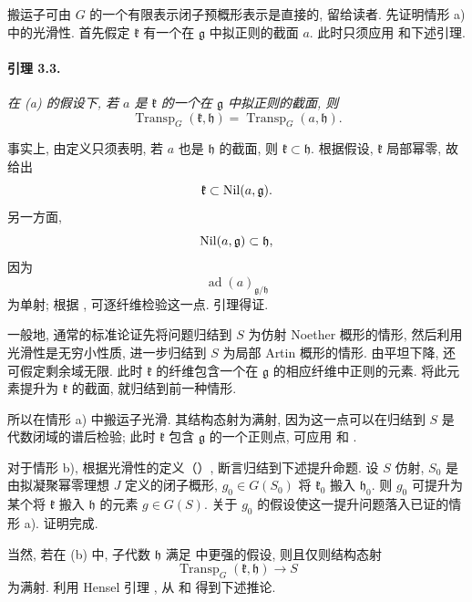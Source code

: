 搬运子可由 \(G\) 的一个有限表示闭子预概形表示是直接的, 留给读者. 先证明情形 a) 中的光滑性. 首先假定 \(\mathfrak k\) 有一个在 \(\mathfrak g\) 中拟正则的截面 \(a\). 此时只须应用  和下述引理.

\paragraph{\textbf{引理 3.3.}}
{\itshape 在 \textup{(a)} 的假设下, 若 \(a\) 是 \(\mathfrak k\) 的一个在 \(\mathfrak g\) 中拟正则的截面, 则
\[
  \operatorname{Transp}_G(\mathfrak k,\mathfrak h)
  =
  \operatorname{Transp}_G(a,\mathfrak h).
\]}

事实上, 由定义只须表明, 若 \(a\) 也是 \(\mathfrak h\) 的截面, 则 \(\mathfrak k\subset\mathfrak h\). 根据假设, \(\mathfrak k\) 局部幂零, 故  给出
\[
  \mathfrak k\subset\operatorname{Nil}(a,\mathfrak g).
\]
另一方面,
\[
  \operatorname{Nil}(a,\mathfrak g)\subset\mathfrak h,
\]
因为
\[
  \operatorname{ad}(a)_{\mathfrak g/\mathfrak h}
\]
为单射; 根据 , 可逐纤维检验这一点. 引理得证.

一般地, 通常的标准论证先将问题归结到 \(S\) 为仿射 Noether 概形的情形, 然后利用光滑性是无穷小性质, 进一步归结到 \(S\) 为局部 Artin 概形的情形. 由平坦下降, 还可假定剩余域无限. 此时 \(\mathfrak k\) 的纤维包含一个在 \(\mathfrak g\) 的相应纤维中正则的元素. 将此元素提升为 \(\mathfrak k\) 的截面, 就归结到前一种情形.

所以在情形 a) 中搬运子光滑. 其结构态射为满射, 因为这一点可以在归结到 \(S\) 是代数闭域的谱后检验; 此时 \(\mathfrak k\) 包含 \(\mathfrak g\) 的一个正则点, 可应用  和 .

对于情形 b), 根据光滑性的定义\textup{（）}, 断言归结到下述提升命题. 设 \(S\) 仿射, \(S_0\) 是由拟凝聚幂零理想 \(J\) 定义的闭子概形, \(g_0\in G(S_0)\) 将 \(\mathfrak k_0\) 搬入 \(\mathfrak h_0\). 则 \(g_0\) 可提升为某个将 \(\mathfrak k\) 搬入 \(\mathfrak h\) 的元素 \(g\in G(S)\). 关于 \(g_0\) 的假设使这一提升问题落入已证的情形 a). 证明完成.

当然, 若在 \textup{(b)} 中, 子代数 \(\mathfrak h\) 满足  中更强的假设, 则且仅则结构态射
\[
  \operatorname{Transp}_G(\mathfrak k,\mathfrak h)
  \longrightarrow S
\]
为满射. 利用 Hensel 引理 , 从  和  得到下述推论.

